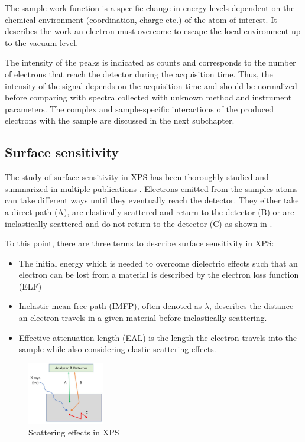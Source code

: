 The sample work function is a specific change in energy levels dependent on the chemical environment (coordination, charge etc.) of the atom of interest. It describes the work an electron must overcome to escape the local environment up to the vacuum level. 



The intensity of the peaks is indicated as counts and corresponds to the number of electrons that reach the detector during the acquisition time. Thus, the intensity of the signal depends on the acquisition time and should be normalized before comparing with spectra collected with unknown method and instrument parameters.
The complex and sample-specific interactions of the produced electrons with the sample are discussed in the next subchapter.

\subsection{Surface sensitivity}

The study of surface sensitivity in XPS has been thoroughly studied and summarized in multiple publications \cite{powell_surface_2009, }. Electrons emitted from the samples atoms can take different ways until they eventually reach the detector. They either take a direct path (A), are elastically scattered and return to the detector (B) or are inelastically scattered and do not return to the detector (C) as shown in .

To this point, there are three terms to describe surface sensitivity in XPS:
\begin{itemize}
\item The initial energy which is needed to overcome dielectric effects such that an electron can be lost from a material is described by the electron loss function (ELF)
\item Inelastic mean free path (IMFP), often denoted as $\lambda$, describes the distance an electron travels in a given material before inelastically scattering.
\item Effective attenuation length (EAL) is the length the electron travels into the sample while also considering elastic scattering effects.

\end{itemize}

\begin{figure}
    \centering
    \includegraphics[width=0.3\textwidth]{Figures/image6_1.jpg}
    \caption{Scattering effects in XPS \cite{stevie_introduction_2020}}
    \label{fig:scattering}
\end{figure}

